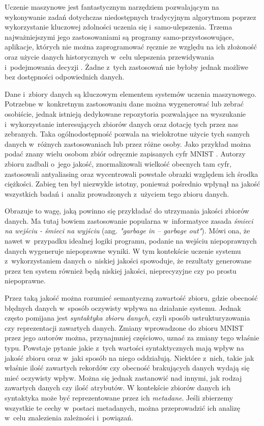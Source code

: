 Uczenie maszynowe jest fantastycznym narzędziem pozwalającym na wykonywanie zadań dotychczas niedostępnych tradycyjnym algorytmom poprzez wykorzystanie kluczowej zdolności uczenia się i~samo-ulepszenia.
Trzema najważniejszymi jego zastosowaniami są programy samo-przystosowujące, aplikacje, których nie można zaprogramować ręcznie ze względu na ich złożoność oraz użycie danych historycznych w~celu ulepszenia przewidywania i~podejmowania decyzji \cite{mitchell1997machine}.
Żadne z~tych zastosowań nie byłoby jednak możliwe bez dostępności odpowiednich danych.

Dane i~zbiory danych są kluczowym elementem systemów uczenia maszynowego.
Potrzebne w~konkretnym zastosowaniu dane można wygenerować lub zebrać osobiście, jednak istnieją dedykowane repozytoria pozwalające na wyszukanie i~wykorzystanie interesujących zbiorów danych oraz dotację tych przez nas zebranych.
Taka ogólnodostępność pozwala na wielokrotne użycie tych samych danych w~różnych zastosowaniach lub przez różne osoby.
Jako przykład można podać znany wielu osobom zbiór odręcznie zapisanych cyfr MNIST \cite{mnist}.
Autorzy zbioru zadbali o~jego jakość, znormalizowali wielkość obecnych tam cyfr, zastosowali antyaliasing oraz wycentrowali powstałe obrazki względem ich środka ciężkości.
Zabieg ten był niezwykle istotny, ponieważ pośrednio wpłynął na jakość wszystkich badań i~analiz prowadzonych z~użyciem tego zbioru danych.

Obrazuje to wagę, jaką powinno się przykładać do utrzymania jakości zbiorów danych.
Ma tutaj bowiem zastosowanie popularna w~informatyce zasada \textit{śmieci na wejściu - śmieci na wyjściu} (ang. \textit{"garbage in -- garbage out"}).
Mówi ona, że nawet w~przypadku idealnej logiki programu, podanie na wejściu niepoprawnych danych wygeneruje niepoprawne wyniki.
W tym kontekście uczenie systemu z~wykorzystaniem danych o~niskiej jakości spowoduje, że rezultaty generowane przez ten system również będą niskiej jakości, nieprecyzyjne czy po prostu niepoprawne.

Przez taką jakość można rozumieć semantyczną zawartość zbioru, gdzie obecność błędnych danych w~sposób oczywisty wpływa na działanie systemu.
Jednak często pomijana jest \textit{syntaktyka zbioru danych}, czyli sposób ustrukturyzowania czy reprezentacji zawartych danych.
Zmiany wprowadzone do zbioru MNIST przez jego autorów można, przynajmniej częściowo, uznać za zmiany tego właśnie typu.
Powstaje pytanie jakie z~tych wartości syntaktycznych mają wpływ na jakość zbioru oraz w~jaki sposób na niego oddziałują.
Niektóre z~nich, takie jak właśnie ilość zawartych rekordów czy obecność brakujących danych wydają się mieć oczywisty wpływ.
Można się jednak zastanowić nad innymi, jak rodzaj zawartych danych czy ilość atrybutów.
W kontekście zbiorów danych ich syntaktyka może być reprezentowane przez ich \textit{metadane}.
Jeśli zbierzemy wszystkie te cechy w~postaci metadanych, można przeprowadzić ich analizę w~celu znalezienia zależności i~powiązań.

